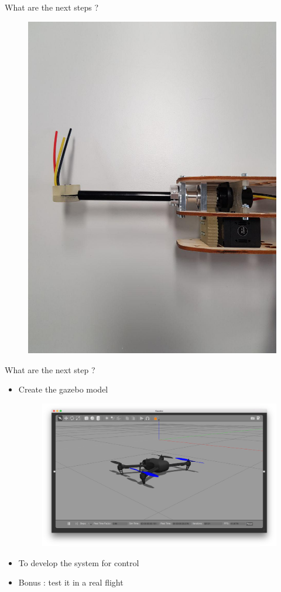 \documentclass{beamer}
\begin{document}
\begin{frame}{What are the next steps ?}
\begin{itemize}
\begin{figure}
\includegraphics[scale=0.3]{pictures/build3}
\end{figure}
\end{itemize}
\end{frame}

\begin{frame}{What are the next step ?}
\begin{itemize}
\item Create the gazebo model
\begin{figure}
\includegraphics[scale=0.1]{pictures/gazebo}
\end{figure}
\item To develop the system for control
\item Bonus : test it in a real flight
\end{itemize}
\end{frame}
\end{document}
